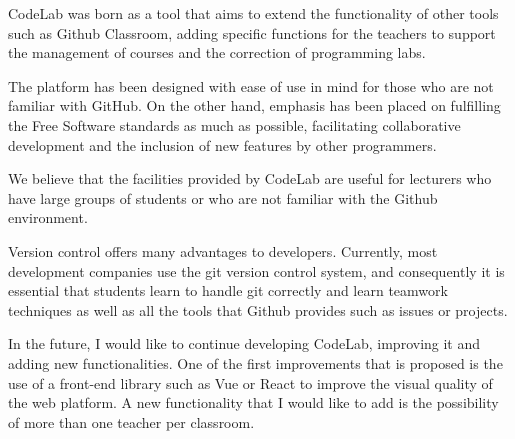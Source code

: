 

CodeLab was born as a tool that aims to extend the functionality
of other tools such as Github Classroom, adding specific functions
for the teachers to support the management of courses and 
the correction of programming labs.

The platform has been designed with ease of use in mind for those
who are not familiar with GitHub. On the other hand, emphasis has
been placed on fulfilling the Free Software standards as much as
possible,
facilitating collaborative development and the inclusion of new features by other programmers.

We believe that the facilities provided by  CodeLab are
useful for lecturers who have large groups of students
or who are not familiar with the Github environment.

Version control offers many advantages to developers.
Currently, most development companies use the git version control system, 
and consequently it is essential that students learn to handle git correctly and
learn teamwork techniques as well as all the tools that Github
provides such as issues or projects.

In the future, I would like to continue developing CodeLab, improving
it and adding new functionalities. One of the first improvements
that is proposed is the use of a front-end library such as Vue or
React to improve the visual quality of the web platform. A new
functionality that I would like to add is the possibility of more
than one teacher per classroom.
